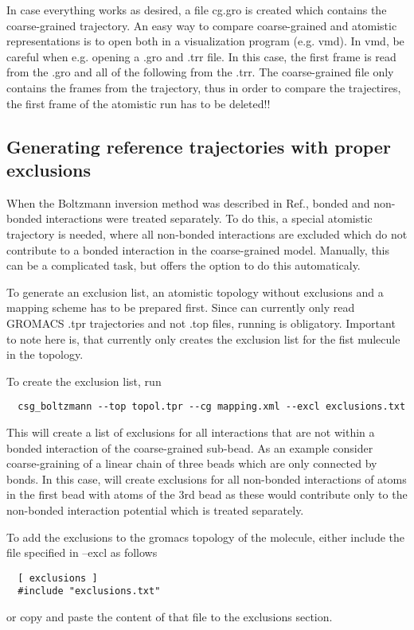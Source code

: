 In case everything works as desired, a file cg.gro is created which contains the coarse-grained trajectory. An easy way to compare coarse-grained and atomistic representations is to open both in a visualization program (e.g. vmd).  In vmd, be careful when e.g. opening a .gro and .trr file. In this case, the first frame is read from the .gro and all of the following from the .trr. The coarse-grained file only contains the frames from the trajectory, thus in order to compare the trajectires, the first frame of the atomistic run has to be deleted!!

\subsection{Generating reference trajectories with proper exclusions}
When the Boltzmann inversion method was described in Ref.\cite{Tschoep:1998}, bonded and non-bonded interactions were treated separately. To do this, a special atomistic trajectory is needed, where all non-bonded interactions are excluded which do not contribute to a bonded interaction in the coarse-grained model. Manually, this can be a complicated task, but  offers the option  to do this automaticaly.

To generate an exclusion list, an atomistic topology without exclusions and a mapping scheme has to be prepared first. Since \votca can currently only read GROMACS .tpr trajectories and not .top files, running  is obligatory. Important to note here is, that  currently only creates the exclusion list for the fist mulecule in the topology.

To create the exclusion list, run
\begin{verbatim}
  csg_boltzmann --top topol.tpr --cg mapping.xml --excl exclusions.txt
\end{verbatim}
This will create a list of exclusions for all interactions that are not within a bonded interaction of the coarse-grained sub-bead. As an example consider coarse-graining of a linear chain of three beads  which are only connected by bonds. In this case,  will create exclusions for all non-bonded interactions of atoms in the first bead with atoms of the 3rd bead as these would contribute only to the non-bonded interaction potential which is treated separately.

To add the exclusions to the gromacs topology of the molecule, either include the file specified in --excl as follows
\begin{verbatim}
  [ exclusions ]
  #include "exclusions.txt"
\end{verbatim}
or copy and paste the content of that file to the exclusions section.


